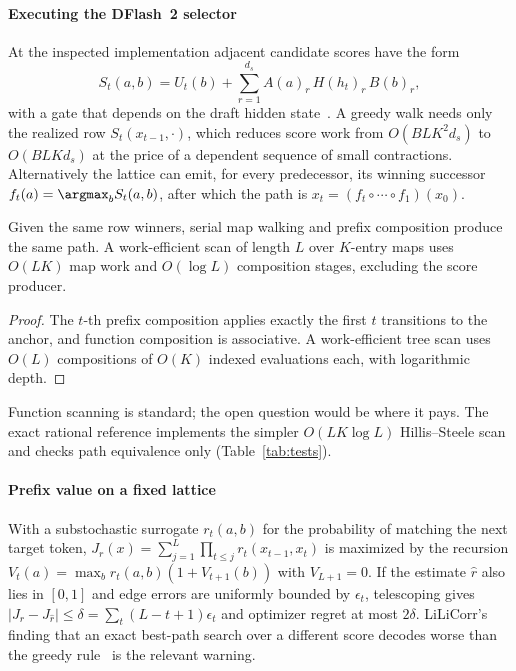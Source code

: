 \paragraph{Executing the DFlash~2 selector} At the inspected implementation adjacent candidate scores have the form
\begin{equation}
S_t(a,b)=U_t(b)+\sum_{r=1}^{d_s}A(a)_r\,H(h_t)_r\,B(b)_r,\label{eq:selector}
\end{equation}
with a gate that depends on the draft hidden state~\cite{dflash,sgcode}. A greedy walk needs only the realized row $S_t(x_{t-1},\cdot)$, which reduces score work from $O(BLK^2d_s)$ to $O(BLKd_s)$ at the price of a dependent sequence of small contractions. Alternatively the lattice can emit, for every predecessor, its winning successor $f_t(a)=\argmax_bS_t(a,b)$, after which the path is $x_t=(f_t\circ\cdots\circ f_1)(x_0)$.
\begin{proposition}\label{prop:maps}
Given the same row winners, serial map walking and prefix composition produce the same path. A work-efficient scan of length $L$ over $K$-entry maps uses $O(LK)$ map work and $O(\log L)$ composition stages, excluding the score producer.
\end{proposition}
\begin{proof}
The $t$-th prefix composition applies exactly the first $t$ transitions to the anchor, and function composition is associative. A work-efficient tree scan uses $O(L)$ compositions of $O(K)$ indexed evaluations each, with logarithmic depth.
\end{proof}
Function scanning is standard; the open question would be where it pays. The exact rational reference implements the simpler $O(LK\log L)$ Hillis--Steele scan and checks path equivalence only (Table~\ref{tab:tests}).

\paragraph{Prefix value on a fixed lattice} With a substochastic surrogate $r_t(a,b)$ for the probability of matching the next target token, $J_r(x)=\sum_{j=1}^{L}\prod_{t\le j}r_t(x_{t-1},x_t)$ is maximized by the recursion $V_t(a)=\max_br_t(a,b)(1+V_{t+1}(b))$ with $V_{L+1}=0$. If the estimate $\hat r$ also lies in $[0,1]$ and edge errors are uniformly bounded by $\epsilon_t$, telescoping gives $|J_r-J_{\hat r}|\le\delta=\sum_t(L-t+1)\epsilon_t$ and optimizer regret at most $2\delta$. LiLiCorr's finding that an exact best-path search over a different score decodes worse than the greedy rule~\cite{lilicorr} is the relevant warning.

